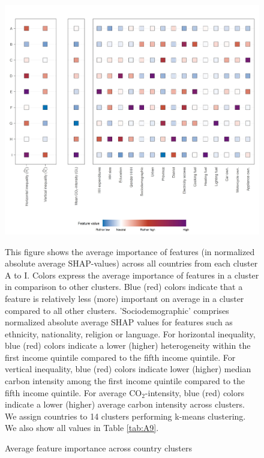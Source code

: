 \documentclass[12pt, a4paper]{article}
\newenvironment{subcaption}
{\strut
\vspace{-5pt}
\begin{minipage}[b]{0.9\textwidth}
  \hspace*{-\parindent}
  \footnotesize}
 {\end{minipage}}
\begin{document}
\begin{figure}[ht!]
    \centering
    \includegraphics{1_Figures/Figure 3/Figure_3_Corrected.jpg}
    \caption{Average feature importance across country clusters}
    \label{fig:fig_3}
    \begin{subcaption}
    This figure shows the average importance of features (in normalized absolute average SHAP-values) across all countries from each cluster A to I. Colors express the average importance of features in a cluster in comparison to other clusters. Blue (red) colors indicate that a feature is relatively less (more) important on average in a cluster compared to all other clusters. 'Sociodemographic' comprises normalized absolute average SHAP values for features such as ethnicity, nationality, religion or language.
    For horizontal inequality, blue (red) colors indicate a lower (higher) heterogeneity within the first income quintile compared to the fifth income quintile. For vertical inequality, blue (red) colors indicate lower (higher) median carbon intensity among the first income quintile compared to the fifth income quintile. For average CO$_{2}$-intensity, blue (red) colors indicate a lower (higher) average carbon intensity across clusters. We assign countries to 14 clusters performing k-means clustering. We also show all values in Table \ref{tab:A9}.
    \end{subcaption}
\end{figure}
\end{document}
